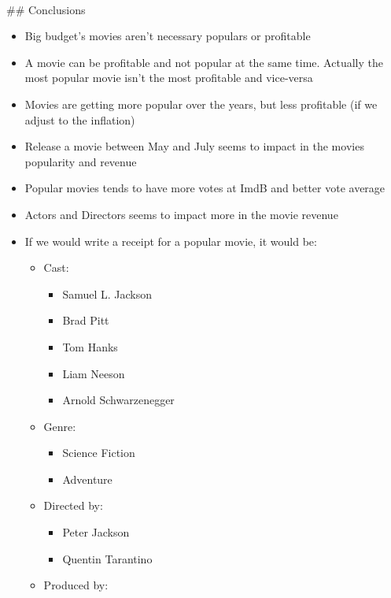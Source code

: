 \documentclass[11pt]{article}
\providecommand{\tightlist}{%
      \setlength{\itemsep}{0pt}\setlength{\parskip}{0pt}}
\begin{document}
    \begin{center}
    \end{center}
    { \hspace*{\fill} \\}
    
     \#\# Conclusions

\begin{itemize}
\item
  Big budget's movies aren't necessary populars or profitable
\item
  A movie can be profitable and not popular at the same time. Actually
  the most popular movie isn't the most profitable and vice-versa
\item
  Movies are getting more popular over the years, but less profitable
  (if we adjust to the inflation)
\item
  Release a movie between May and July seems to impact in the movies
  popularity and revenue
\item
  Popular movies tends to have more votes at ImdB and better vote
  average
\item
  Actors and Directors seems to impact more in the movie revenue
\item
  If we would write a receipt for a popular movie, it would be:

  \begin{itemize}
  \tightlist
  \item
    Cast:

    \begin{itemize}
    \tightlist
    \item
      Samuel L. Jackson
    \item
      Brad Pitt
    \item
      Tom Hanks
    \item
      Liam Neeson
    \item
      Arnold Schwarzenegger
    \end{itemize}
  \item
    Genre:

    \begin{itemize}
    \tightlist
    \item
      Science Fiction
    \item
      Adventure
    \end{itemize}
  \item
    Directed by:

    \begin{itemize}
    \tightlist
    \item
      Peter Jackson
    \item
      Quentin Tarantino
    \end{itemize}
  \item
    Produced by:


\end{itemize}
\end{itemize}
\end{document}
